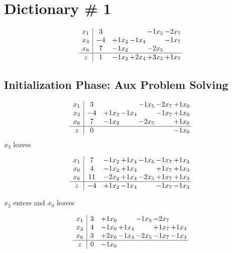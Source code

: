 \documentclass[12pt]{article}
\begin{document}
\section{Dictionary \# 1}

\[\begin{array}{c| c c@{\hskip 2pt} c@{\hskip 2pt} c@{\hskip 2pt} c@{\hskip 2pt} }
 x_{1}   &  3  &    &   & -1 x_{5} & -2 x_{7}\\
 x_{3}   &  -4 & + 1 x_{2} & -1 x_{4} &   & -1 x_{7}\\
 x_{6}   &  7 & -1 x_{2} &   & -2 x_{5} &   \\
\hline
z    &  1 & -1 x_{2} & + 2 x_{4} & + 3 x_{5} & + 1 x_{7}\\
\end{array}\]

\subsection{Initialization Phase: Aux Problem Solving}
\[\begin{array}{c| c c@{\hskip 2pt} c@{\hskip 2pt} c@{\hskip 2pt} c@{\hskip 2pt} c@{\hskip 2pt} }
 x_{1}   &  3  &    &   & -1 x_{5} & -2 x_{7} & + 1 x_{0}\\
 x_{3}   &  -4 & + 1 x_{2} & -1 x_{4} &   & -1 x_{7} & + 1 x_{0}\\
 x_{6}   &  7 & -1 x_{2} &   & -2 x_{5} &   & + 1 x_{0}\\
\hline
z    &  0  &    &    &    &   & -1 x_{0}\\
\end{array}\]
$ x_{3} $ leaves 

 \[\begin{array}{c| c c@{\hskip 2pt} c@{\hskip 2pt} c@{\hskip 2pt} c@{\hskip 2pt} c@{\hskip 2pt} }
 x_{1}   &  7 & -1 x_{2} & + 1 x_{4} & -1 x_{5} & -1 x_{7} & + 1 x_{3}\\
 x_{0}   &  4 & -1 x_{2} & + 1 x_{4} &   & + 1 x_{7} & + 1 x_{3}\\
 x_{6}   &  11 & -2 x_{2} & + 1 x_{4} & -2 x_{5} & + 1 x_{7} & + 1 x_{3}\\
\hline
z    &  -4 & + 1 x_{2} & -1 x_{4} &   & -1 x_{7} & -1 x_{3}\\
\end{array}\]


 $ x_{2} $ enters and $ x_{0} $ leaves 

 \[\begin{array}{c| c c@{\hskip 2pt} c@{\hskip 2pt} c@{\hskip 2pt} c@{\hskip 2pt} c@{\hskip 2pt} }
 x_{1}   &  3 & + 1 x_{0} &   & -1 x_{5} & -2 x_{7} &   \\
 x_{2}   &  4 & -1 x_{0} & + 1 x_{4} &   & + 1 x_{7} & + 1 x_{3}\\
 x_{6}   &  3 & + 2 x_{0} & -1 x_{4} & -2 x_{5} & -1 x_{7} & -1 x_{3}\\
\hline
z    &  0 & -1 x_{0} &    &    &    &   \\
\end{array}\]
\end{document}
